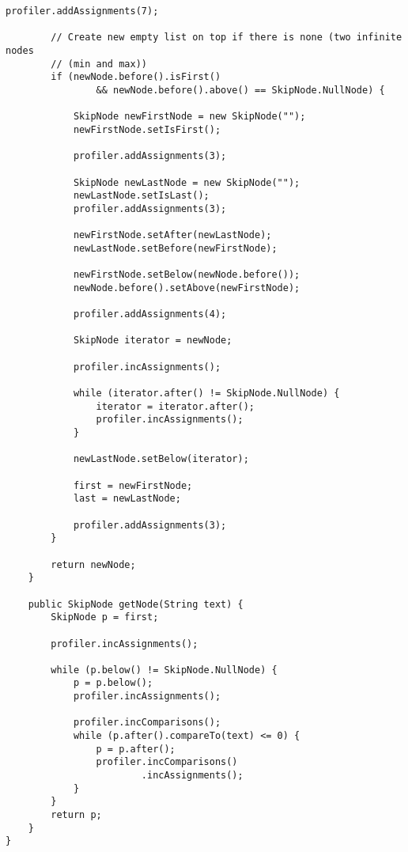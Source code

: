 \begin{lstlisting}[caption=Skip List classes Source code - SkipList]
		profiler.addAssignments(7);

		// Create new empty list on top if there is none (two infinite nodes
		// (min and max))
		if (newNode.before().isFirst()
				&& newNode.before().above() == SkipNode.NullNode) {
			
			SkipNode newFirstNode = new SkipNode("");
			newFirstNode.setIsFirst();
			
			profiler.addAssignments(3);
			
			SkipNode newLastNode = new SkipNode("");
			newLastNode.setIsLast();
			profiler.addAssignments(3);
			
			newFirstNode.setAfter(newLastNode);
			newLastNode.setBefore(newFirstNode);

			newFirstNode.setBelow(newNode.before());
			newNode.before().setAbove(newFirstNode);

			profiler.addAssignments(4);
			
			SkipNode iterator = newNode;
			
			profiler.incAssignments();
			
			while (iterator.after() != SkipNode.NullNode) {
				iterator = iterator.after();
				profiler.incAssignments();
			}
			
			newLastNode.setBelow(iterator);

			first = newFirstNode;
			last = newLastNode;
			
			profiler.addAssignments(3);
		}

		return newNode;
	}

	public SkipNode getNode(String text) {
		SkipNode p = first;
		
		profiler.incAssignments();
		
		while (p.below() != SkipNode.NullNode) {
			p = p.below();
			profiler.incAssignments();
			
			profiler.incComparisons();
			while (p.after().compareTo(text) <= 0) {
				p = p.after();
				profiler.incComparisons()
						.incAssignments();
			}
		}
		return p;
	}
}
\end{lstlisting}

